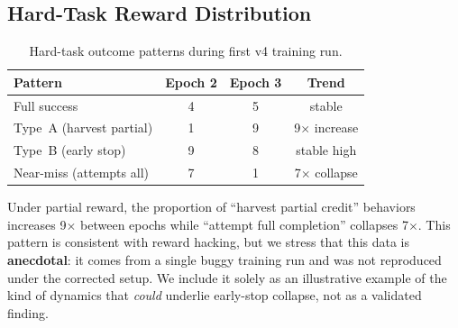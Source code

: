 \documentclass[11pt]{article}
\begin{document}
\subsection{Hard-Task Reward Distribution}

\begin{table}[h]
\centering
\caption{Hard-task outcome patterns during first v4 training run.}
\small
\begin{tabular}{@{}lccc@{}}
\toprule
\textbf{Pattern} & \textbf{Epoch 2} & \textbf{Epoch 3} & \textbf{Trend} \\
\midrule
Full success & 4 & 5 & stable \\
Type~A (harvest partial) & 1 & 9 & 9$\times$ increase \\
Type~B (early stop) & 9 & 8 & stable high \\
Near-miss (attempts all) & 7 & 1 & 7$\times$ collapse \\
\bottomrule
\end{tabular}
\end{table}

Under partial reward, the proportion of ``harvest partial credit'' behaviors increases 9$\times$ between epochs while ``attempt full completion'' collapses 7$\times$. This pattern is consistent with reward hacking, but we stress that this data is \textbf{anecdotal}: it comes from a single buggy training run and was not reproduced under the corrected setup. We include it solely as an illustrative example of the kind of dynamics that \emph{could} underlie early-stop collapse, not as a validated finding.
\end{document}
